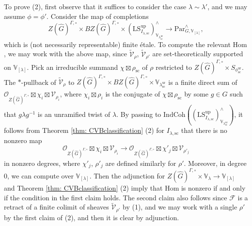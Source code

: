 \documentclass{amsart}
\theoremstyle{definition}
\theoremstyle{remark}
\numberwithin{equation}{section}
\newcommand{\mc}{\mathcal}
\newcommand{\Sc}{\mathrm{sc}}
\newcommand{\Hom}{\mathrm{Hom}}
\newcommand{\wh}{\widehat}
\newcommand{\Par}{\mathrm{Par}}
\newcommand{\IndCoh}{\mathrm{IndCoh}}
\newcommand{\ur}{\mathrm{ur}}
\newcommand{\V}{\mathbb{V}}
\newcommand{\up}{\mathrm{up}}
\newcommand{\LS}{\mathrm{LS}}
\begin{document}
To prove (2), first observe that it suffices to consider the case $\lambda\sim \lambda'$, and we may assume $\phi=\phi'$. Consider the map of completions
\[
Z(\wh G)^{\Gamma,\circ}\times BZ(\wh G)^{\Gamma,\circ} \times (\LS^\up_{I_{\lambda,\Sc}})^\wedge_{\V_{\lambda^\ur_\Sc}} \to \Par^\wedge_{G,\V_{[\lambda]}},
\]
which is (not necessarily representable) finite \'etale. To compute the relevant $\Hom$, we may work with the above map, since $\widetilde{\mc V}_\rho$, $\widetilde{\mc V}_{\rho'}$ are set-theoretically supported on $\V_{[\lambda]}$. Pick an irreducible summand $\chi\boxtimes \rho_{\Sc}$ of $\rho$ restricted to $Z(\wh G)^{\Gamma,\circ}\times S_{\phi^\ur_\Sc}$. The $*$-pullback of $\widetilde{\mc V}_{\rho}$ to $Z(\wh G)^{\Gamma, \circ}\times BZ(\wh G)^{\Gamma, \circ}\times \V_{\lambda^\ur_\Sc}$ is a finite direct sum of $\mc O_{Z(\wh G)^{\Gamma,\circ}}\boxtimes \chi_i\boxtimes \mc V_{\rho_i}$, where $\chi_i\boxtimes\rho_i$ is the conjugate of $\chi\boxtimes\rho_\Sc$ by some $g\in \wh G$ such that $g\lambda g^{-1}$ is an unramified twist of $\lambda$. By passing to $\IndCoh((\LS^\up_{I_{\lambda,\Sc}})^\wedge_{\V_{\lambda^\ur_\Sc}})$, it follows from Theorem \ref{thm: CVBclassification} (2) for $I_{\lambda,\Sc}$ that there is no nonzero map
\[
\mc O_{Z(\wh G)^{\Gamma,\circ}}\boxtimes \chi_i \boxtimes \mc V_{\rho_i} \to \mc O_{Z(\wh G)^{\Gamma,\circ}}\boxtimes \chi'_j\boxtimes \mc V_{\rho'_j}
\]
in nonzero degrees, where $\chi'_j$, $\rho'_j$ are defined similarly for $\rho'$. Moreover, in degree 0, we can compute over $\V_{[\lambda]}$. Then the adjunction for $Z(\wh G)^{\Gamma,\circ}\times \V_\lambda \to \V_{[\lambda]}$ and Theorem \ref{thm: CVBclassification} (2) imply that $\Hom$ is nonzero if and only if the condition in the first claim holds. The second claim also follows since $\mc F$ is a retract of a finite colimit of sheaves $\widetilde{\mc V}_{\rho'}$ by (1), and we may work with a single $\rho'$ by the first claim of (2), and then it is clear by adjunction. 
\end{document}
